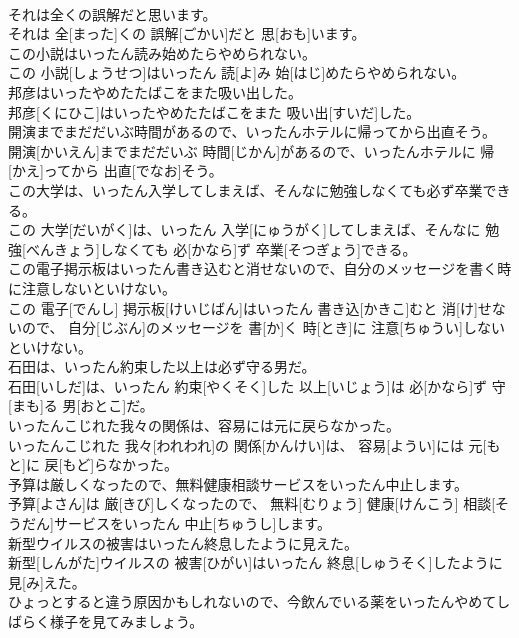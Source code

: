 \documentclass[8pt]{extreport}
\begin{document}
\begin{CJK}{UTF8}{min}
\\	それは全くの誤解だと思います。	
\\	それは 全[まった]くの 誤解[ごかい]だと 思[おも]います。
\\	この小説はいったん読み始めたらやめられない。	
\\	この 小説[しょうせつ]はいったん 読[よ]み 始[はじ]めたらやめられない。
\\	邦彦はいったやめたたばこをまた吸い出した。	
\\	邦彦[くにひこ]はいったやめたたばこをまた 吸い出[すいだ]した。
\\	開演までまだだいぶ時間があるので、いったんホテルに帰ってから出直そう。	
\\	開演[かいえん]までまだだいぶ 時間[じかん]があるので、いったんホテルに 帰[かえ]ってから 出直[でなお]そう。
\\	この大学は、いったん入学してしまえば、そんなに勉強しなくても必ず卒業できる。	
\\	この 大学[だいがく]は、いったん 入学[にゅうがく]してしまえば、そんなに 勉強[べんきょう]しなくても 必[かなら]ず 卒業[そつぎょう]できる。
\\	この電子掲示板はいったん書き込むと消せないので、自分のメッセージを書く時に注意しないといけない。	
\\	この 電子[でんし] 掲示板[けいじばん]はいったん 書き込[かきこ]むと 消[け]せないので、 自分[じぶん]のメッセージを 書[か]く 時[とき]に 注意[ちゅうい]しないといけない。
\\	石田は、いったん約束した以上は必ず守る男だ。	
\\	石田[いしだ]は、いったん 約束[やくそく]した 以上[いじょう]は 必[かなら]ず 守[まも]る 男[おとこ]だ。
\\	いったんこじれた我々の関係は、容易には元に戻らなかった。	
\\	いったんこじれた 我々[われわれ]の 関係[かんけい]は、 容易[ようい]には 元[もと]に 戻[もど]らなかった。
\\	予算は厳しくなったので、無料健康相談サービスをいったん中止します。	
\\	予算[よさん]は 厳[きび]しくなったので、 無料[むりょう] 健康[けんこう] 相談[そうだん]サービスをいったん 中止[ちゅうし]します。
\\	新型ウイルスの被害はいったん終息したように見えた。	
\\	新型[しんがた]ウイルスの 被害[ひがい]はいったん 終息[しゅうそく]したように 見[み]えた。
\\	ひょっとすると違う原因かもしれないので、今飲んでいる薬をいったんやめてしばらく様子を見てみましょう。	

\end{CJK}
\end{document}
